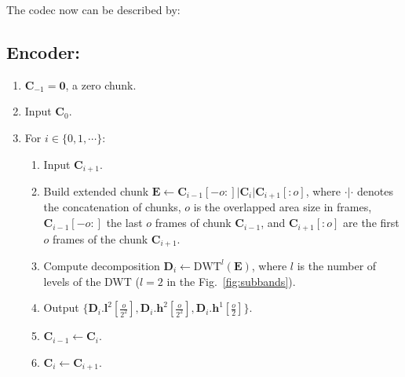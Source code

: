 
The codec now can be described by:

\subsection*{Encoder:}
\begin{enumerate}
\item ${\mathbf C}_{-1}={\mathbf 0}$, a zero chunk.
\item Input ${\mathbf C}_0$.
\item For $i\in\{0,1,\cdots\}$:   
  \begin{enumerate}               
  \item Input ${\mathbf C}_{i+1}$.
  \item Build extended chunk ${\mathbf E}\leftarrow {\mathbf
    C}_{i-1}[-o:]|{\mathbf C}_i|{\mathbf C}_{i+1}[:o]$, where
    $\cdot|\cdot$ denotes the concatenation of chunks, $o$ is the
    overlapped area size in frames, ${\mathbf C}_{i-1}[-o:]$ the last
    $o$ frames of chunk ${\mathbf C}_{i-1}$, and ${\mathbf
      C}_{i+1}[:o]$ are the first $o$ frames of the chunk ${\mathbf
      C}_{i+1}$.
  \item Compute decomposition ${\mathbf D}_i \leftarrow
    \text{DWT}^l({\mathbf E})$, where $l$ is the number of levels of
    the DWT ($l=2$ in the Fig.~\ref{fig:subbands}).
  \item Output
    $\Big\{{\mathbf D}_i.{\mathbf l}^2[\frac{o}{2^2}], {\mathbf
      D}_i.{\mathbf h}^2[\frac{o}{2^2}], {\mathbf D}_i.{\mathbf
      h}^1[\frac{o}{2}]\Big\}$.
  \item ${\mathbf C}_{i-1}\leftarrow {\mathbf C}_i$.
  \item ${\mathbf C}_i\leftarrow {\mathbf C}_{i+1}$.
  \end{enumerate}
\end{enumerate}


